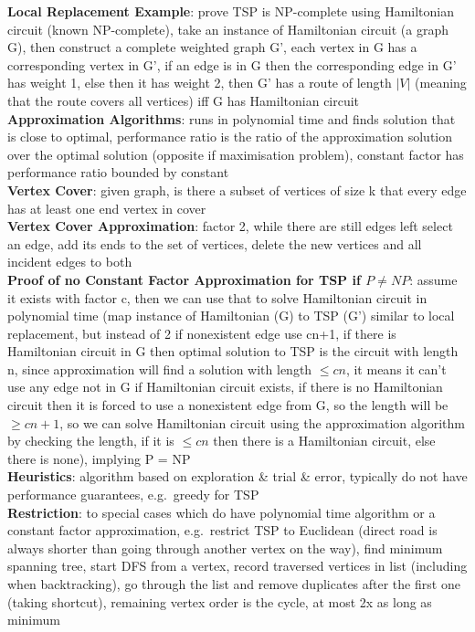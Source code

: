 \documentclass[a4paper]{article}
\begin{document}
\begin{multicols}{2}
        \textbf{Local Replacement Example}: prove TSP is NP-complete using Hamiltonian circuit (known NP-complete), take an instance of Hamiltonian circuit (a graph G), then construct a complete weighted graph G', each vertex in G has a corresponding vertex in G', if an edge is in G then the corresponding edge in G' has weight 1, else then it has weight 2, then G' has a route of length $|V|$ (meaning that the route covers all vertices) iff G has Hamiltonian circuit\\
        \textbf{Approximation Algorithms}: runs in polynomial time and finds solution that is close to optimal, performance ratio is the ratio of the approximation solution over the optimal solution (opposite if maximisation problem), constant factor has performance ratio bounded by constant\\
        \textbf{Vertex Cover}: given graph, is there a subset of vertices of size k that every edge has at least one end vertex in cover\\
        \textbf{Vertex Cover Approximation}: factor 2, while there are still edges left select an edge, add its ends to the set of vertices, delete the new vertices and all incident edges to both\\
        \textbf{Proof of no Constant Factor Approximation for TSP if $P \neq NP$}: assume it exists with factor c, then we can use that to solve Hamiltonian circuit in polynomial time (map instance of Hamiltonian (G) to TSP (G') similar to local replacement, but instead of 2 if nonexistent edge use cn+1, if there is Hamiltonian circuit in G then optimal solution to TSP is the circuit with length n, since approximation will find a solution with length $\leq cn$, it means it can't use any edge not in G if Hamiltonian circuit exists, if there is no Hamiltonian circuit then it is forced to use a nonexistent edge from G, so the length will be $\geq cn+1$, so we can solve Hamiltonian circuit using the approximation algorithm by checking the length, if it is $\leq cn$ then there is a Hamiltonian circuit, else there is none), implying P = NP\\
        \textbf{Heuristics}: algorithm based on exploration \& trial \& error, typically do not have performance guarantees, e.g.\ greedy for TSP\\
        \textbf{Restriction}: to special cases which do have polynomial time algorithm or a constant factor approximation, e.g.\ restrict TSP to Euclidean (direct road is always shorter than going through another vertex on the way), find minimum spanning tree, start DFS from a vertex, record traversed vertices in list (including when backtracking), go through the list and remove duplicates after the first one (taking shortcut), remaining vertex order is the cycle, at most 2x as long as minimum\\

\end{multicols}
\end{document}
